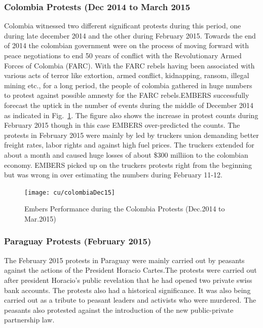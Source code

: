 \subsubsection*{Colombia Protests (Dec 2014 to March 2015}
Colombia witnessed two different significant protests during this period, one during late december 2014 
and the other during February 2015. Towards the end of 2014 the colombian government were on the process
of moving forward with peace negotiations to end 50 years of conflict with the Revolutionary Armed Forces 
of Colombia (FARC). With the FARC rebels having been associated with various acts of terror like extortion, armed conflict,
kidnapping, ransom, illegal mining etc., for a long period, the people of colombia gathered in huge numbers
 to protest against possible amnesty for the FARC rebels.EMBERS successfully forecast the uptick in the number of events during the
middle of December 2014 as indicated in Fig.~\ref{fig:colombiaDec14}. The figure also shows the increase in protest counts
during February 2015 though in this case EMBERS over-predicted the counts. The protests in February 2015
were mainly by led by truckers union demanding better freight rates, labor rights and against high fuel prices.
The truckers extended for about a month and caused huge losses of about \$300 milliion to the colombian economy.
EMBERS picked up on the truckers protests right from the beginning but was wrong in over estimating the numbers during 
February 11-12.

\begin{figure}[H]
\centering
\texttt{[image: cu/colombiaDec15]}
\caption{Embers Performance during the Colombia Protests (Dec.2014 to Mar.2015)}
\label{fig:colombiaDec14}
\end{figure}

\subsubsection*{Paraguay Protests (February 2015)}
The February 2015 protests in Paraguay were mainly carried out by peasants
against the actions of the President Horacio Cartes.The protests were carried out after 
president Horacio's public revelation that he had opened two private swiss bank accounts.
The protests also had a historical significance. It was also being carried out as a tribute 
to peasant leaders and activists who were murdered. The peasants also protested 
against the introduction of the new public-private partnership law.

